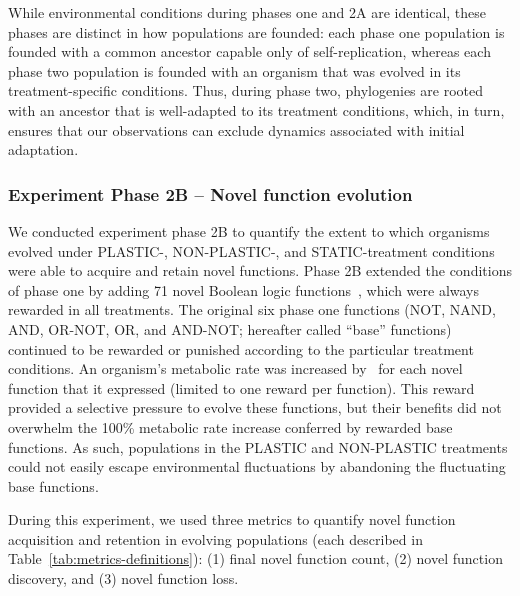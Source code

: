\documentclass[utf8]{frontiersSCNS} %
\begin{document}
\begin{raggedbottom}
While environmental conditions during phases one and 2A are identical, these phases are distinct in how populations are founded: each phase one population is founded with a common ancestor capable only of self-replication, whereas each phase two population is founded with an organism that was evolved in its treatment-specific conditions.
Thus, during phase two, phylogenies are rooted with an ancestor that is well-adapted to its treatment conditions, which, in turn, ensures that our observations can exclude dynamics associated with initial adaptation.

\subsubsection{Experiment Phase 2B -- Novel function evolution}
\label{sec:methods:exp:novel-task-evolution}

We conducted experiment phase 2B to quantify the extent to which organisms evolved under PLASTIC-, NON-PLASTIC-, and STATIC-treatment conditions were able to acquire and retain novel functions. 
Phase 2B extended the conditions of phase one by adding 71 novel Boolean logic functions~\citep{ofria_avida:_2009}, which were always rewarded in all treatments.
The original six phase one functions (NOT, NAND, AND, OR-NOT, OR, and AND-NOT; hereafter called ``base'' functions) continued to be rewarded or punished according to the particular treatment conditions.
An organism's metabolic rate was increased by \novelTraitsReward\ for each novel function that it expressed (limited to one reward per function).
This reward provided a selective pressure to evolve these functions, but their benefits did not overwhelm the 100\% metabolic rate increase conferred by rewarded base functions.
As such, populations in the PLASTIC and NON-PLASTIC treatments could not easily escape environmental fluctuations by abandoning the fluctuating base functions.

During this experiment, we used three metrics to quantify novel function acquisition and retention in evolving populations (each described in Table~\ref{tab:metrics-definitions}):
(1) final novel function count,
(2) novel function discovery,
and (3) novel function loss.


\end{raggedbottom}
\end{document}
